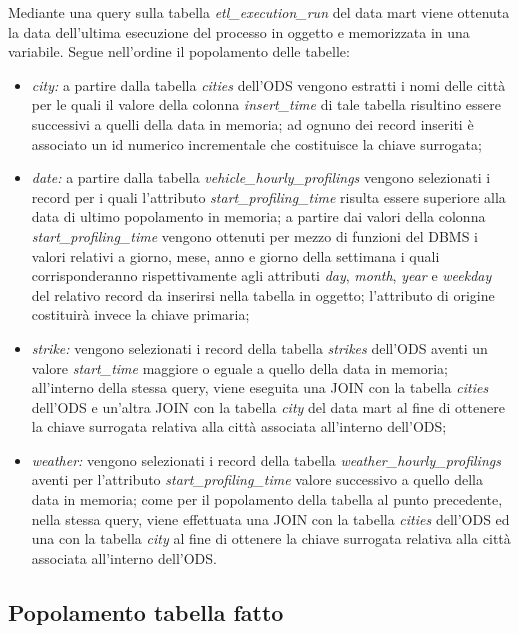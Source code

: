 Mediante una query sulla tabella \textit{etl\_execution\_run} del data mart
viene ottenuta la data dell'ultima esecuzione del processo in oggetto e
memorizzata in una variabile. Segue nell'ordine il popolamento delle tabelle:
\begin{itemize}
\item \textit{city:} a partire dalla tabella \textit{cities} dell'ODS vengono
estratti i nomi delle città per le quali il valore della colonna
\textit{insert\_time} di tale tabella risultino essere successivi a quelli 
della data in memoria; ad ognuno dei record inseriti è associato un id
numerico incrementale che costituisce la chiave surrogata;
\item \textit{date:} a partire dalla tabella \textit{vehicle\_hourly\_profilings}
vengono selezionati i record per i quali l'attributo
\textit{start\_profiling\_time} risulta essere superiore alla data di ultimo
popolamento in memoria; a partire dai valori della colonna
\textit{start\_profiling\_time} vengono ottenuti per mezzo di funzioni del DBMS
i valori relativi a giorno, mese, anno e giorno della settimana i quali
corrisponderanno rispettivamente agli attributi \textit{day}, \textit{month},
\textit{year} e \textit{weekday} del relativo record da inserirsi nella tabella
in oggetto; l'attributo di origine costituirà invece la chiave primaria;
\item \textit{strike:} vengono selezionati i record della tabella \textit{strikes}
dell'ODS aventi un valore \textit{start\_time} maggiore o eguale a quello della
data in memoria; all'interno della stessa query, viene eseguita una JOIN con la
tabella \textit{cities} dell'ODS e un'altra JOIN con la tabella \textit{city}
del data mart al fine di ottenere la chiave surrogata relativa alla città
associata all'interno dell'ODS;
\item \textit{weather:} vengono selezionati i record della tabella
\textit{weather\_hourly\_profilings} aventi per l'attributo
\textit{start\_profiling\_time} valore successivo a quello della data in memoria;
come per il popolamento della tabella al punto precedente, nella stessa query,
viene effettuata una JOIN con la tabella \textit{cities} dell'ODS ed una con la
tabella \textit{city} al fine di ottenere la chiave surrogata relativa alla città
associata all'interno dell'ODS.
\end{itemize}

\subsection{Popolamento tabella fatto}

